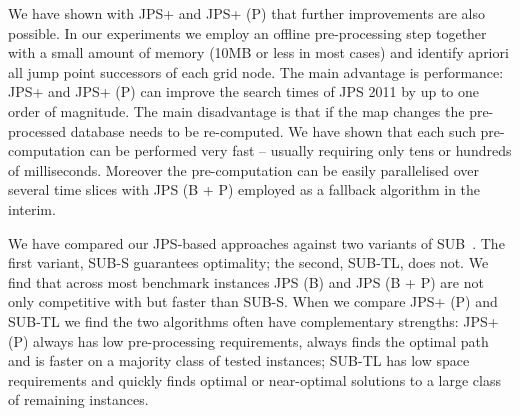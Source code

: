 We have shown with JPS+ and JPS+ (P) that further improvements are also possible. 
In our experiments we employ an offline pre-processing step together with a small 
amount of memory (10MB or less in most cases) and identify apriori all jump 
point successors of each grid node.
The main advantage is performance: JPS+ and JPS+ (P) can improve the search times of 
JPS 2011 by up to one order of magnitude.
The main disadvantage is that if the map changes the pre-processed
database needs to be re-computed. We have shown that each such pre-computation
can be performed very fast -- usually requiring only tens or hundreds of 
milliseconds. Moreover the pre-computation can be easily parallelised over
several time slices with JPS (B + P) employed as a fallback algorithm in
the interim.

We have compared our JPS-based approaches against two variants of SUB~\cite{urasKH13}.
The first variant, SUB-S guarantees optimality; the second, SUB-TL, does not. 
We find that across most benchmark instances JPS (B) and 
JPS (B + P) are not only competitive with but faster than SUB-S. When we compare
JPS+ (P) and SUB-TL we find the two algorithms often have complementary strengths:
JPS+ (P) always has low pre-processing requirements, always finds the optimal path
and is faster on a majority class of tested instances; SUB-TL has low space
requirements and quickly finds optimal or near-optimal solutions to a large class 
of remaining instances.

